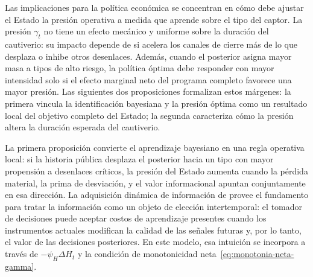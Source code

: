 \documentclass[pdflatex,sn-mathphys-ay]{sn-jnl}
\theoremstyle{thmstyleone}
\theoremstyle{thmstyletwo}
\theoremstyle{thmstylethree}
\newcommand{\1}{\mathbf{1}}
\begin{document}
\noindent Las implicaciones para la política económica se concentran en cómo debe ajustar el Estado la presión operativa a medida que aprende sobre el tipo del captor. La presión $\gamma_t$ no tiene un efecto mecánico y uniforme sobre la duración del cautiverio: su impacto depende de si acelera los canales de cierre más de lo que desplaza o inhibe otros desenlaces. Además, cuando el posterior asigna mayor masa a tipos de alto riesgo, la política óptima debe responder con mayor intensidad solo si el efecto marginal neto del programa completo favorece una mayor presión. Las siguientes dos proposiciones formalizan estos márgenes: la primera vincula la identificación bayesiana y la presión óptima como un resultado local del objetivo completo del Estado; la segunda caracteriza cómo la presión altera la duración esperada del cautiverio.

\noindent La primera proposición convierte el aprendizaje bayesiano en una regla operativa local: si la historia pública desplaza el posterior hacia un tipo con mayor propensión a desenlaces críticos, la presión del Estado aumenta cuando la pérdida material, la prima de desviación, y el valor informacional apuntan conjuntamente en esa dirección. La adquisición dinámica de información de \citet{Zhong2022} provee el fundamento para tratar la información como un objeto de elección intertemporal: el tomador de decisiones puede aceptar costos de aprendizaje presentes cuando los instrumentos actuales modifican la calidad de las señales futuras y, por lo tanto, el valor de las decisiones posteriores. En este modelo, esa intuición se incorpora a través de $-\psi_H\Delta H_t$ y la condición de monotonicidad neta~\eqref{eq:monotonia-neta-gamma}.
\end{document}

